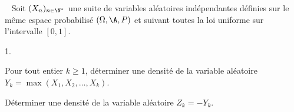 \documentclass[11pt]{article}%
\begin{document}
\begin{exerciceSP}~
  Soit $(X_n)_{n\in\N^*}$ une suite de variables aléatoires
  indépendantes définies sur le même espace probabilisé
  $(\Omega,\A,P)$ et suivant toutes la loi uniforme sur l'intervalle
  $[0,1]$.
  \begin{noliste}{1.}
    \setlength{\itemsep}{2mm}
  \item Pour tout entier $k\geq 1$, déterminer une densité de la
    variable aléatoire $Y_k=\max(X_1,X_2,\hdots,X_k)$.
  \item Déterminer une densité de la variable aléatoire $Z_k=-Y_k$.
  \end{noliste}
\end{exerciceSP}


\newpage


\end{document}
